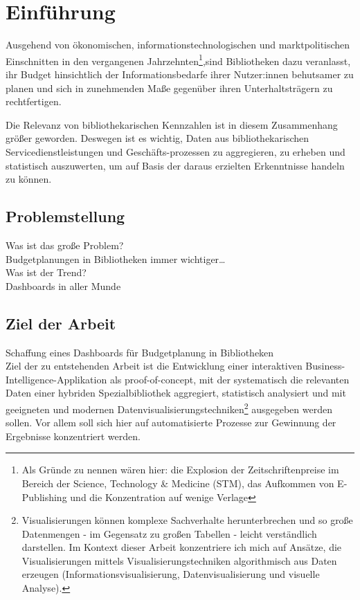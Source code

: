 \chapter{Einführung}


Ausgehend von ökonomischen, informationstechnologischen und marktpolitischen Einschnitten in den
vergangenen Jahrzehnten\footnote{Als Gründe zu nennen wären hier: die Explosion der Zeitschriftenpreise im Bereich der
Science, Technology \& Medicine (STM), das Aufkommen von E-Publishing und die Konzentration auf wenige
Verlage},sind Bibliotheken dazu veranlasst, ihr Budget hinsichtlich der Informationsbedarfe
ihrer Nutzer:innen behutsamer zu planen und sich in zunehmenden Maße gegenüber ihren Unterhaltsträgern zu rechtfertigen.

Die Relevanz von bibliothekarischen Kennzahlen ist in diesem Zusammenhang größer geworden.
Deswegen ist es wichtig, Daten aus bibliothekarischen Servicedienstleistungen und Geschäfts-prozessen zu aggregieren, zu erheben und statistisch
auszuwerten, um auf Basis der daraus erzielten Erkenntnisse handeln zu können.

\section{Problemstellung}

Was ist das große Problem?\\
Budgetplanungen in Bibliotheken immer wichtiger…\\
Was ist der Trend?\\
Dashboards in aller Munde



\section{Ziel der Arbeit}

Schaffung eines Dashboards für Budgetplanung in Bibliotheken\\

Ziel der zu entstehenden Arbeit ist die Entwicklung einer
interaktiven Business-Intelligence-Applikation als proof-of-concept,
mit der systematisch die relevanten Daten einer hybriden Spezialbibliothek aggregiert, statistisch
analysiert und mit geeigneten und modernen Datenvisualisierungstechniken\footnote{Visualisierungen können komplexe Sachverhalte herunterbrechen und
so große Datenmengen - im Gegensatz zu großen Tabellen - leicht verständlich
darstellen. Im Kontext dieser Arbeit konzentriere ich mich auf Ansätze, die Visualisierungen mittels Visualisierungstechniken algorithmisch aus
Daten erzeugen (Informationsvisualisierung, Datenvisualisierung und visuelle Analyse).\cite{mayank_yuvaraj_infographics_2017}}
ausgegeben werden sollen.
Vor allem soll sich hier auf automatisierte Prozesse zur Gewinnung der Ergebnisse konzentriert werden.

